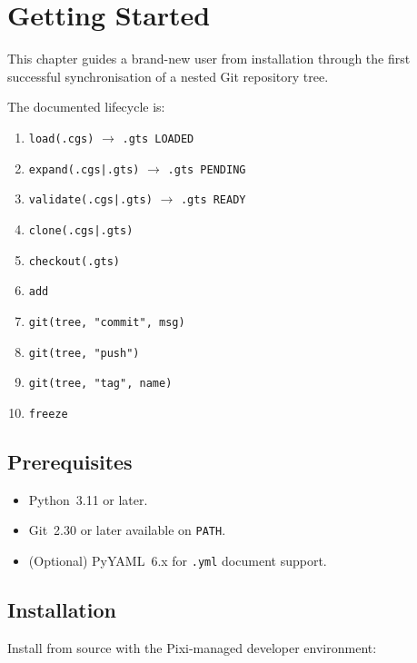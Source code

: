 
\chapter{Getting Started}

This chapter guides a brand-new user from installation through the first
successful synchronisation of a nested Git repository tree.

The documented lifecycle is:

\begin{enumerate}
  \item \texttt{load(.cgs)} $\rightarrow$ \texttt{.gts LOADED}
  \item \texttt{expand(.cgs|.gts)} $\rightarrow$ \texttt{.gts PENDING}
  \item \texttt{validate(.cgs|.gts)} $\rightarrow$ \texttt{.gts READY}
  \item \texttt{clone(.cgs|.gts)}
  \item \texttt{checkout(.gts)}
  \item \texttt{add}
  \item \texttt{git(tree, "commit", msg)}
  \item \texttt{git(tree, "push")}
  \item \texttt{git(tree, "tag", name)}
  \item \texttt{freeze}
\end{enumerate}

\section{Prerequisites}

\begin{itemize}
  \item Python~3.11 or later.
  \item Git~2.30 or later available on \texttt{PATH}.
  \item (Optional) PyYAML~6.x for \texttt{.yml} document support.
\end{itemize}

\section{Installation}

Install \cgspkg{} from source with the Pixi-managed developer environment:

